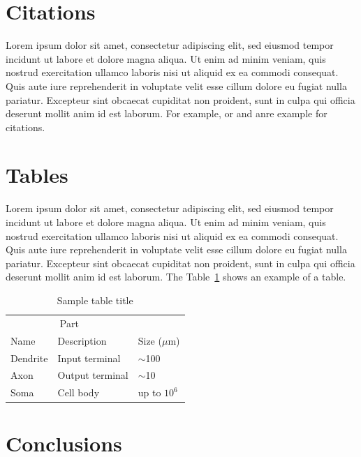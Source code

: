 \documentclass{article}
\begin{document}
\section{Citations}

Lorem ipsum dolor sit amet, consectetur adipiscing elit, sed eiusmod tempor incidunt ut labore et dolore magna aliqua. Ut enim ad minim veniam, quis nostrud exercitation ullamco laboris nisi ut aliquid ex ea commodi consequat. Quis aute iure reprehenderit in voluptate velit esse cillum dolore eu fugiat nulla pariatur. Excepteur sint obcaecat cupiditat non proident, sunt in culpa qui officia deserunt mollit anim id est laborum. For example, \cite{reference_1} or \cite{reference_2} and \cite{reference_3} anre example for citations.


\section{Tables}

Lorem ipsum dolor sit amet, consectetur adipiscing elit, sed eiusmod tempor incidunt ut labore et dolore magna aliqua. Ut enim ad minim veniam, quis nostrud exercitation ullamco laboris nisi ut aliquid ex ea commodi consequat. Quis aute iure reprehenderit in voluptate velit esse cillum dolore eu fugiat nulla pariatur. Excepteur sint obcaecat cupiditat non proident, sunt in culpa qui officia deserunt mollit anim id est laborum. The Table~\ref{sample-table} shows an example of a table.

\begin{table}[H]
  \caption{Sample table title}
  \label{sample-table}
  \centering
  \begin{tabular}{lll}
    \toprule
    \multicolumn{2}{c}{Part}                   \\
    \cmidrule(r){1-2}
    Name     & Description     & Size ($\mu$m) \\
    \midrule
    Dendrite & Input terminal  & $\sim$100     \\
    Axon     & Output terminal & $\sim$10      \\
    Soma     & Cell body       & up to $10^6$  \\
    \bottomrule
  \end{tabular}
\end{table}


\section{Conclusions}
\end{document}

